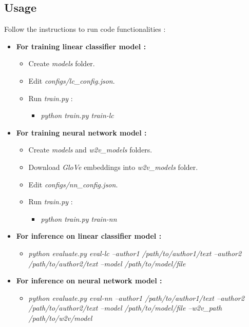 \documentclass[letterpaper, 10 pt, conference]{ieeeconf}  %
\begin{document}
\subsection{Usage}
Follow the instructions to run code functionalities :
\begin{itemize}
    \item \textbf{For training linear classifier model :}
    \begin{itemize}
        \item Create \emph{models} folder.
        \item Edit \emph{configs/lc\_config.json}.
        \item Run \emph{train.py} :
        \begin{itemize}
            \item \emph{python train.py train-lc}
        \end{itemize}
    \end{itemize}
    \item \textbf{For training neural network model :}
    \begin{itemize}
        \item Create \emph{models} and \emph{w2v\_models} folders.
        \item Download \emph{GloVe} embeddings into \emph{w2v\_models} folder.
        \item Edit \emph{configs/nn\_config.json}.
        \item Run \emph{train.py} :
        \begin{itemize}
            \item \emph{python train.py train-nn}
        \end{itemize}
    \end{itemize}
    \item \textbf{For inference on linear classifier model :}
    \begin{itemize}
        \item \emph{python evaluate.py eval-lc --author1 /path/to/author1/text --author2 /path/to/author2/text --model /path/to/model/file}
    \end{itemize}
    \item \textbf{For inference on neural network model :}
    \begin{itemize}
        \item \emph{python evaluate.py eval-nn --author1 /path/to/author1/text --author2 /path/to/author2/text --model /path/to/model/file --w2v\_path /path/to/w2v/model}
    \end{itemize}
\end{itemize}
\end{document}
